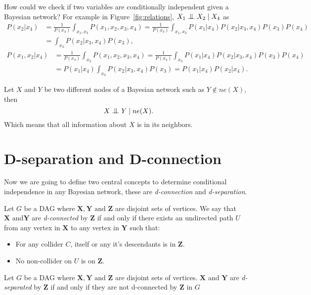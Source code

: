 How could we check if two variables are conditionally independent given a
Bayesian network? For example in Figure~\ref{fig:relations}, \(X_1 \bigCI
X_2 \mid X_4\) as
\[
\begin{aligned}
P(x_2 | x_4) &= \frac{1}{P(x_4)}\int_{x_1,x_3}P(x_1, x_2, x_3, x_4)
= \frac{1}{P(x_4)}\int_{x_1,x_3}P(x_1|x_4)P(x_2|x_3,x_4)P(x_3)P(x_4)\\
                 &= \int_{x_3}P(x_2|x_3, x_4)P(x_3),
\end{aligned}
\]
\[
\begin{aligned}
P(x_1, x_2 | x_4) &= \frac{1}{P(x_4)}\int_{x_3}P(x_1, x_2, x_3, x_4)
= \frac{1}{P(x_4)}\int_{x_3}P(x_1|x_4)P(x_2|x_3,x_4)P(x_3)P(x_4)\\
                 &= P(x_1|x_4)\int_{x_3}P(x_2|x_3, x_4)P(x_3) = P(x_1|x_4)P(x_2|x_4).
\end{aligned}
\]

\begin{proposition}\label{prop:bn_neig_indep}
  Let \(X\) and \(Y\) be two different nodes of a Bayesian network such as \(Y \not \in ne(X)\), then
  \[
    X \bigCI Y \mid ne(X).
  \]
  Which means that all information about \(X\) is in its neighbors.
\end{proposition}

\section{D-separation and D-connection}

Now we are going to define two central concepts to determine conditional
independence in any Bayesian network, these are \emph{d-connection} and \emph{d-separation}.

\begin{definition}
Let \(G\) be a DAG where \(\bm{X}, \bm{Y} \text{ and } \bm{Z}\)
are disjoint sets of vertices. We say that \(\bm{X} \text{ and
} \bm{Y}\) are \emph{d-connected} by \(\bm{Z}\) if and only if there
exists an undirected path \(U\) from any vertex in \(\bm{X}\) to any
vertex in \(\bm{Y}\) such that:
\begin{itemize}
\item For any collider \(C\), itself or any it's descendants is in \(\bm{Z}\).
\item No non-collider on \(U\) is on \(\bm{Z}\).
\end{itemize}
\end{definition}

\begin{definition}
Let \(G\) be a DAG where \(\bm{X}, \bm{Y} \text{ and } \bm{Z}\)
are disjoint sets of vertices. \(\bm{X}\) and \(\bm{Y}\)
are \emph{d-separated} by \(\bm{Z}\) if and only if they are not
d-connected by \(\bm{Z}\) in \(G\)
\end{definition}

